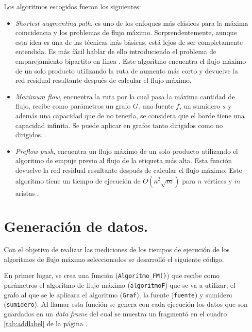 \documentclass{article}
\begin{document}
Los algoritmos escogidos fueron los siguientes:
\begin{itemize}
  \item\textit{Shortest augmenting path}, es uno de los enfoques más clásicos para la máxima coincidencia y los problemas de flujo máximo. Sorprendentemente, aunque esta idea es una de las técnicas más básicas, está lejos de ser completamente entendida. Es más fácil hablar de ello introduciendo el problema de emparejamiento bipartito en línea \cite{Bosek2018}. Este algoritmo encuentra el flujo máximo de un solo producto utilizando la ruta de aumento más corto y devuelve la red residual resultante después de calcular el flujo máximo.   
   \item\textit{Maximum flow}, encuentra la ruta por la cual pasa la máxima cantidad de flujo, recibe como parámetros un grafo $G$, una fuente $f$, un sumidero $s$ y además una capacidad que de no tenerla, se considera que el borde tiene una capacidad infinita. Se puede aplicar en grafos tanto dirigidos como no dirigidos. \cite{mf}.
	\item\textit{Preflow push}, encuentra un flujo máximo de un solo producto utilizando el algoritmo de empuje previo al flujo de la etiqueta más alta. Esta función devuelve la red residual resultante después de calcular el flujo máximo. Este algoritmo tiene un tiempo de ejecución de $ O(n^{2}\sqrt{m})$ para $n$ vértices y $m$ aristas \cite{gc}.
\end{itemize}
\section{Generación de datos.}
Con el objetivo de realizar las mediciones de los tiempos de ejecución de los algoritmos de flujo máximo seleccionados se desarrolló el siguiente código.

En primer lugar, se crea una función (\texttt{Algoritmo\_FM()}) que recibe como parámetros el algoritmo de flujo máximo (\texttt{algoritmoF}) que se va a utilizar, el grafo al que se le aplicara el algoritmo (\texttt{Graf}), la fuente (\texttt{fuente}) y sumidero (\texttt{sumidero}). Al llamar esta función se genera con cada ejecución los datos que son guardados en un \textit{data frame} del cual se muestra un fragmentó en el cuadro \ref{tab:addlabel} de la página \pageref{tab:addlabel}.

\begin{center}

\end{center}
\end{document}
